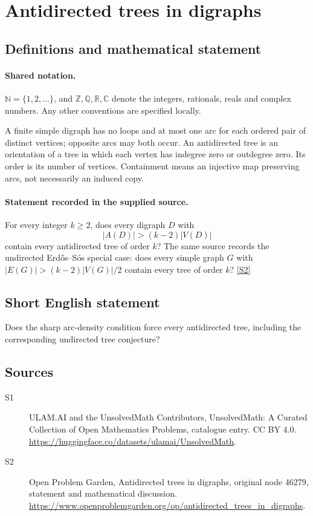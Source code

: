 \documentclass[11pt]{article}
\newcommand{\sref}[2]{\hyperlink{source:#1:#2}{[S#2]}}
\begin{document}
\section{Antidirected trees in digraphs}\label{statement}

\subsection{Definitions and mathematical statement}

\paragraph{Shared notation.}$\mathbb N=\{1,2,\ldots\}$, and $\mathbb Z,\mathbb Q,\mathbb R,\mathbb C$ denote the integers, rationals, reals and complex numbers. Any other conventions are specified locally.


A finite simple digraph has no loops and at most one arc for each ordered pair of distinct vertices; opposite arcs may both occur. An antidirected tree is an orientation of a tree in which each vertex has indegree zero or outdegree zero. Its order is its number of vertices. Containment means an injective map preserving arcs, not necessarily an induced copy.
\paragraph{Statement recorded in the supplied source.}
For every integer $k\ge2$, does every digraph $D$ with \[|A(D)|>(k-2)|V(D)|\] contain every antidirected tree of order $k$? The same source records the undirected Erd\H{o}s--S\'os special case: does every simple graph $G$ with $|E(G)|>(k-2)|V(G)|/2$ contain every tree of order $k$? \sref{statement}{2}
\subsection{Short English statement}
Does the sharp arc-density condition force every antidirected tree, including the corresponding undirected tree conjecture?
\subsection{Sources}
\begin{description}
\item[\hypertarget{source:statement:1}{S1}] ULAM.AI and the UnsolvedMath Contributors, UnsolvedMath: A Curated Collection of Open Mathematics Problems, catalogue entry. CC BY 4.0. \url{https://huggingface.co/datasets/ulamai/UnsolvedMath}.
\item[\hypertarget{source:statement:2}{S2}] Open Problem Garden, Antidirected trees in digraphs, original node 46279, statement and mathematical discussion. \url{https://www.openproblemgarden.org/op/antidirected_trees_in_digraphs}.
\end{description}
\label{end:statement}
\end{document}
